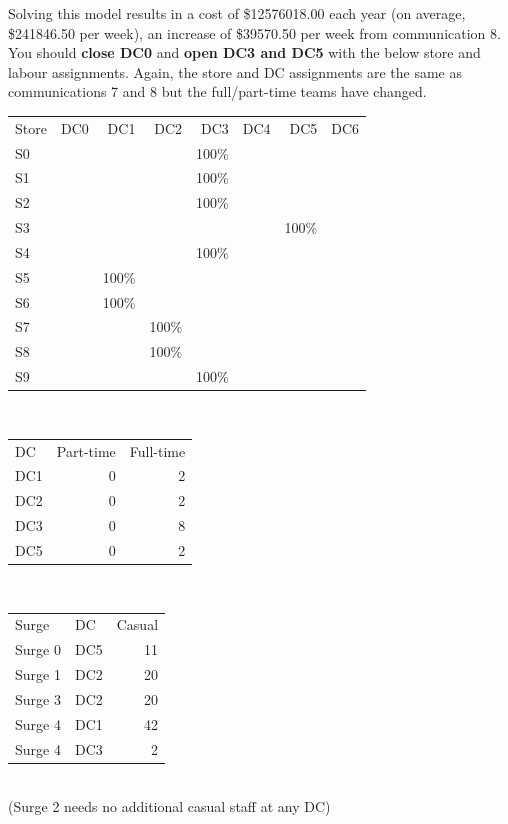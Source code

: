 \documentclass[11pt,a4paper]{article}
\begin{document}
Solving this model results in a cost of \$12576018.00 each year 
(on average, \$241846.50 per week), an increase of \$39570.50 
per week from communication 8.
You should \textbf{close DC0} and 
\textbf{open DC3 and DC5} 
with the below store and labour assignments. 
Again, the store and DC assignments are the same as communications 
7 and 8 but the full/part-time teams have changed.\\[0.8em]
\begin{tabular}{l  r  r  r  r r r r}
    Store & DC0 & DC1 & DC2 & DC3 & DC4 & DC5 & DC6 \\
    S0 &  &  &  & 100\% &  &  &  \\
    S1 &  &  &  & 100\% &  &  &  \\
    S2 &  &  &  & 100\% &  &  &  \\
    S3 &  &  &  &  &  & 100\% &  \\
    S4 &  &  &  & 100\% &  &  &  \\
    S5 &  & 100\% &  &  &  &  &  \\
    S6 &  & 100\% &  &  &  &  &  \\
    S7 &  &  & 100\% &  &  &  &  \\
    S8 &  &  & 100\% &  &  &  &  \\
    S9 &  &  &  & 100\% &  &  &  \\
\end{tabular} \\ [0.8em]
\begin{tabular}{l  r  r }
    DC & Part-time & Full-time \\
    DC1 & 0 &2 \\ 
    DC2  & 0 &2 \\ 
    DC3 &  0& 8 \\
    DC5 &  0&2 \\ 
\end{tabular} \\ [0.8em]
\begin{tabular}{l  l  r }
    Surge & DC & Casual \\
    Surge 0 &DC5& 11  \\ 
    Surge 1&DC2 & 20 \\ 
    Surge 3&DC2 & 20 \\
    Surge 4&DC1 & 42 \\ 
    Surge 4&DC3 & 2 \\ 
\end{tabular} \\[0.8em] (Surge 2 needs no additional casual staff at any DC)
\end{document}
